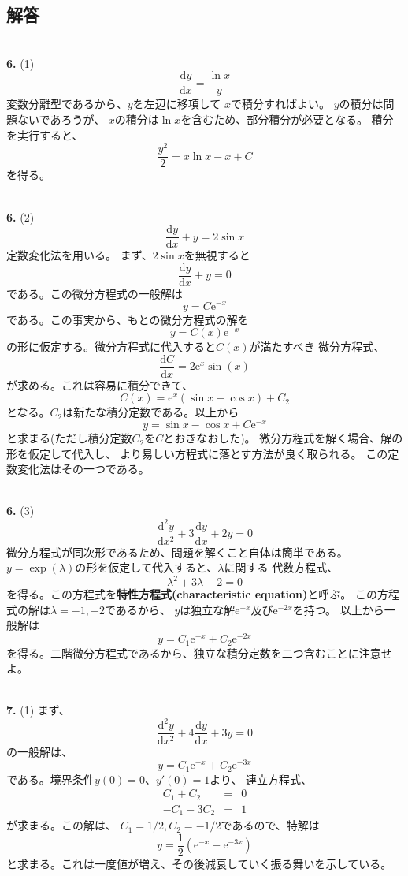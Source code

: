 \documentclass{jarticle}
\newcommand{\diff}{\mathrm d}
\newcommand{\ans}[2]{\noindent\\ {\bf \large #1.} (#2)}
\newcommand{\e}{\mathrm e}
\begin{document}
\subsection{解答}

\ans{6}{1}
$$\frac{\diff y}{\diff x} = \frac{\ln x}{y} $$
変数分離型であるから、$y$を左辺に移項して
$x$で積分すればよい。
$y$の積分は問題ないであろうが、
$x$の積分は$\ln x$を含むため、部分積分が必要となる。
積分を実行すると、
\begin{equation}
  \frac{y^2}{2} = x \ln x - x + C
\end{equation}
を得る。

\ans{6}{2}
$$\frac{\diff y}{\diff x} + y= 2 \sin x $$
定数変化法を用いる。
まず、$2\sin x$を無視すると
\begin{equation}
  \frac{\diff y}{\diff x} + y= 0
\end{equation}
である。この微分方程式の一般解は
$$
  y = C \e^{-x}
$$
である。この事実から、もとの微分方程式の解を
$$
  y = C(x) \e^{-x}
$$
の形に仮定する。微分方程式に代入すると$C(x)$が満たすべき
微分方程式、
$$
  \frac{\diff C}{\diff x} =  2 \e^{x} \sin(x)
$$
が求める。これは容易に積分できて、
$$
  C(x) = \e^x (\sin x - \cos x) + C_2
$$
となる。$C_2$は新たな積分定数である。以上から
\begin{equation}
  y = \sin x - \cos x + C \e^{-x}
\end{equation}
と求まる(ただし積分定数$C_2$を$C$とおきなおした)。
微分方程式を解く場合、解の形を仮定して代入し、
より易しい方程式に落とす方法が良く取られる。
この定数変化法はその一つである。

\ans{6}{3}
$$\frac{\diff^2 y}{\diff x^2} + 3 \frac{\diff y}{\diff x} + 2y = 0 $$
微分方程式が同次形であるため、問題を解くこと自体は簡単である。
$y = \exp(\lambda)$の形を仮定して代入すると、$\lambda$に関する
代数方程式、
\begin{equation}
  \lambda^2 + 3 \lambda + 2 = 0
\end{equation}
を得る。この方程式を{\bf 特性方程式(characteristic equation)}と呼ぶ。
この方程式の解は$\lambda = -1, -2$であるから、
$y$は独立な解$\e^{-x}$及び$\e^{-2x}$を持つ。
以上から一般解は
$$
  y = C_1 \e^{-x} + C_2 \e^{-2x}
$$
を得る。二階微分方程式であるから、独立な積分定数を二つ含むことに注意せよ。

\ans{7}{1}
まず、
$$\frac{\diff^2 y}{\diff x^2} + 4 \frac{\diff y}{\diff x} + 3y = 0$$
の一般解は、
$$
  y = C_1 \e^{-x} + C_2 \e^{-3x}
$$
である。境界条件$y(0) = 0$、$y'(0) = 1$より、
連立方程式、
\begin{eqnarray}
  C_1 + C_2 &=& 0 \\
  -C_1 -3 C_2 &=& 1
\end{eqnarray}
が求まる。この解は、
$C_1 = 1/2, C_2 = - 1/2$であるので、特解は
$$
  y = \frac{1}{2}(\e^{-x} - \e^{-3x})
$$
と求まる。これは一度値が増え、その後減衰していく振る舞いを示している。
\end{document}
